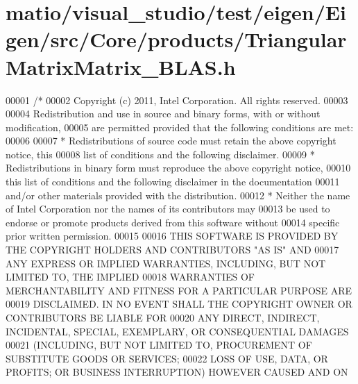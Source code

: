 \hypertarget{matio_2visual__studio_2test_2eigen_2_eigen_2src_2_core_2products_2_triangular_matrix_matrix___b_l_a_s_8h_source}{}\section{matio/visual\+\_\+studio/test/eigen/\+Eigen/src/\+Core/products/\+Triangular\+Matrix\+Matrix\+\_\+\+B\+L\+AS.h}
\label{matio_2visual__studio_2test_2eigen_2_eigen_2src_2_core_2products_2_triangular_matrix_matrix___b_l_a_s_8h_source}

\begin{DoxyCode}
00001 \textcolor{comment}{/*}
00002 \textcolor{comment}{ Copyright (c) 2011, Intel Corporation. All rights reserved.}
00003 \textcolor{comment}{}
00004 \textcolor{comment}{ Redistribution and use in source and binary forms, with or without modification,}
00005 \textcolor{comment}{ are permitted provided that the following conditions are met:}
00006 \textcolor{comment}{}
00007 \textcolor{comment}{ * Redistributions of source code must retain the above copyright notice, this}
00008 \textcolor{comment}{   list of conditions and the following disclaimer.}
00009 \textcolor{comment}{ * Redistributions in binary form must reproduce the above copyright notice,}
00010 \textcolor{comment}{   this list of conditions and the following disclaimer in the documentation}
00011 \textcolor{comment}{   and/or other materials provided with the distribution.}
00012 \textcolor{comment}{ * Neither the name of Intel Corporation nor the names of its contributors may}
00013 \textcolor{comment}{   be used to endorse or promote products derived from this software without}
00014 \textcolor{comment}{   specific prior written permission.}
00015 \textcolor{comment}{}
00016 \textcolor{comment}{ THIS SOFTWARE IS PROVIDED BY THE COPYRIGHT HOLDERS AND CONTRIBUTORS "AS IS" AND}
00017 \textcolor{comment}{ ANY EXPRESS OR IMPLIED WARRANTIES, INCLUDING, BUT NOT LIMITED TO, THE IMPLIED}
00018 \textcolor{comment}{ WARRANTIES OF MERCHANTABILITY AND FITNESS FOR A PARTICULAR PURPOSE ARE}
00019 \textcolor{comment}{ DISCLAIMED. IN NO EVENT SHALL THE COPYRIGHT OWNER OR CONTRIBUTORS BE LIABLE FOR}
00020 \textcolor{comment}{ ANY DIRECT, INDIRECT, INCIDENTAL, SPECIAL, EXEMPLARY, OR CONSEQUENTIAL DAMAGES}
00021 \textcolor{comment}{ (INCLUDING, BUT NOT LIMITED TO, PROCUREMENT OF SUBSTITUTE GOODS OR SERVICES;}
00022 \textcolor{comment}{ LOSS OF USE, DATA, OR PROFITS; OR BUSINESS INTERRUPTION) HOWEVER CAUSED AND ON}

\end{DoxyCode}
